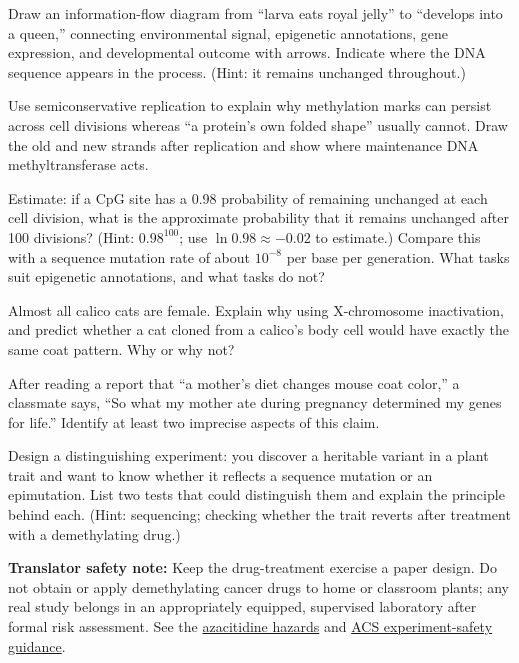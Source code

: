 \begin{sikaoti}
\item Draw an information-flow diagram from ``larva eats royal jelly'' to ``develops into a queen,'' connecting environmental signal, epigenetic annotations, gene expression, and developmental outcome with arrows. Indicate where the DNA sequence appears in the process. (Hint: it remains unchanged throughout.)
\item Use semiconservative replication to explain why methylation marks can persist across cell divisions whereas ``a protein's own folded shape'' usually cannot. Draw the old and new strands after replication and show where maintenance DNA methyltransferase acts.
\item Estimate: if a CpG site has a 0.98 probability of remaining unchanged at each cell division, what is the approximate probability that it remains unchanged after 100 divisions? (Hint: $0.98^{100}$; use $\ln 0.98\approx -0.02$ to estimate.) Compare this with a sequence mutation rate of about $10^{-8}$ per base per generation. What tasks suit epigenetic annotations, and what tasks do not?
\item Almost all calico cats are female. Explain why using X-chromosome inactivation, and predict whether a cat cloned from a calico's body cell would have exactly the same coat pattern. Why or why not?
\item After reading a report that ``a mother's diet changes mouse coat color,'' a classmate says, ``So what my mother ate during pregnancy determined my genes for life.'' Identify at least two imprecise aspects of this claim.
\item Design a distinguishing experiment: you discover a heritable variant in a plant trait and want to know whether it reflects a sequence mutation or an epimutation. List two tests that could distinguish them and explain the principle behind each. (Hint: sequencing; checking whether the trait reverts after treatment with a demethylating drug.)
\end{sikaoti}

\textbf{Translator safety note:} Keep the drug-treatment exercise a paper design. Do not obtain or apply demethylating cancer drugs to home or classroom plants; any real study belongs in an appropriately equipped, supervised laboratory after formal risk assessment. See the \href{https://dailymed.nlm.nih.gov/dailymed/fda/fdaDrugXsl.cfm?setid=80a43736-0598-4e4b-85ba-e29daa290c8f\&type=display}{azacitidine hazards} and \href{https://institute.acs.org/acs-center/lab-safety/education-training/safer-experiments.html}{ACS experiment-safety guidance}.
